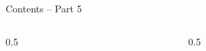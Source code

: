 \documentclass[aspectratio=169,11pt]{beamer}
\subtitle{Part 5: Classification}
\begin{document}
\begin{frame}
  \titlepage
\end{frame}

\aboutlecturer

\courseoverview

\begin{frame}{Contents -- Part 5}
  \begin{columns}[T]
    \begin{column}{0.5\textwidth}
      \tableofcontents[hideallsubsections,sections={1-4}]
    \end{column}
    \begin{column}{0.5\textwidth}
      \tableofcontents[hideallsubsections,sections={5-6}]
    \end{column}
  \end{columns}
\end{frame}
\end{document}
